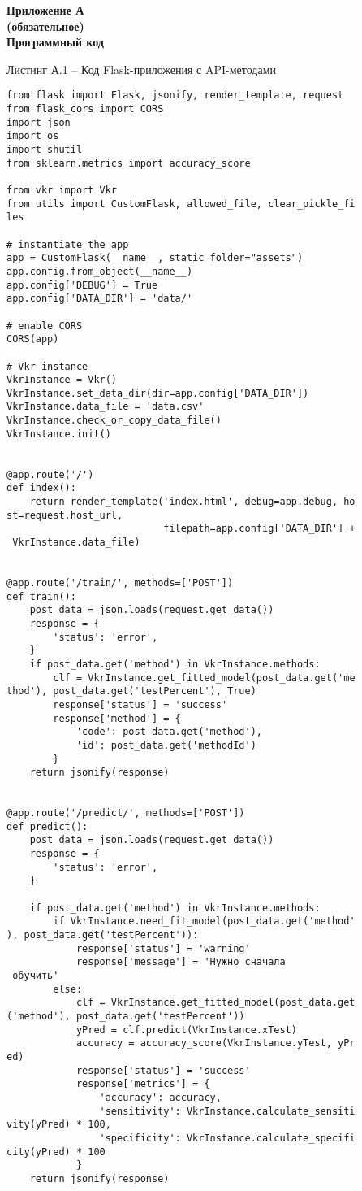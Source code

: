 \newpage
{} 
\begin{center} 
    \textbf{Приложение А}
    \\
    \textbf{(обязательное)}
    \\
    \textbf{Программный код}
\end{center} 
\vspace{8mm}
\par
Листинг А.1 -- Код Flask-приложения с API-методами
\vspace{8mm}
\large
\begin{verbatim}
from flask import Flask, jsonify, render_template, request
from flask_cors import CORS
import json
import os
import shutil
from sklearn.metrics import accuracy_score

from vkr import Vkr
from utils import CustomFlask, allowed_file, clear_pickle_fi
les

# instantiate the app
app = CustomFlask(__name__, static_folder="assets")
app.config.from_object(__name__)
app.config['DEBUG'] = True
app.config['DATA_DIR'] = 'data/'

# enable CORS
CORS(app)

# Vkr instance
VkrInstance = Vkr()
VkrInstance.set_data_dir(dir=app.config['DATA_DIR'])
VkrInstance.data_file = 'data.csv'
VkrInstance.check_or_copy_data_file()
VkrInstance.init()


@app.route('/')
def index():
    return render_template('index.html', debug=app.debug, ho
st=request.host_url,
                           filepath=app.config['DATA_DIR'] +
 VkrInstance.data_file)


@app.route('/train/', methods=['POST'])
def train():
    post_data = json.loads(request.get_data())
    response = {
        'status': 'error',
    }
    if post_data.get('method') in VkrInstance.methods:
        clf = VkrInstance.get_fitted_model(post_data.get('me
thod'), post_data.get('testPercent'), True)
        response['status'] = 'success'
        response['method'] = {
            'code': post_data.get('method'),
            'id': post_data.get('methodId')
        }
    return jsonify(response)


@app.route('/predict/', methods=['POST'])
def predict():
    post_data = json.loads(request.get_data())
    response = {
        'status': 'error',
    }

    if post_data.get('method') in VkrInstance.methods:
        if VkrInstance.need_fit_model(post_data.get('method'
), post_data.get('testPercent')):
            response['status'] = 'warning'
            response['message'] = 'Нужно сначала
 обучить'
        else:
            clf = VkrInstance.get_fitted_model(post_data.get
('method'), post_data.get('testPercent'))
            yPred = clf.predict(VkrInstance.xTest)
            accuracy = accuracy_score(VkrInstance.yTest, yPr
ed)
            response['status'] = 'success'
            response['metrics'] = {
                'accuracy': accuracy,
                'sensitivity': VkrInstance.calculate_sensiti
vity(yPred) * 100,
                'specificity': VkrInstance.calculate_specifi
city(yPred) * 100
            }
    return jsonify(response)



\end{verbatim}
